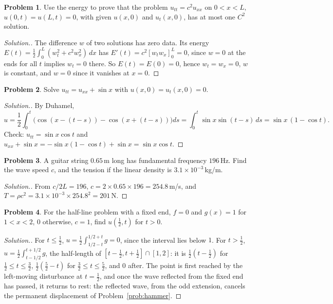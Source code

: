 \documentclass[11pt,a4paper]{article}
\numberwithin{equation}{section}
\theoremstyle{definition}
\newtheorem{problemx}{Problem}[subsection]
\newenvironment{problem}{\begin{problemx}}{\end{problemx}}
\newenvironment{solution}
  {\renewcommand{\qedsymbol}{}\begin{proof}[\textit{Solution}.]}
  {\end{proof}}
\begin{document}
\begin{problem}
Use the energy to prove that the problem $u_{tt} = c^2u_{xx}$ on $0 < x < L$, $u(0, t) = u(L, t) = 0$, with given $u(x, 0)$ and $u_t(x, 0)$, has at most one $C^2$ solution.
\end{problem}

\begin{solution}
The difference $w$ of two solutions has zero data. Its energy $E(t) = \frac12\int_0^L(w_t^2 + c^2w_x^2)\,dx$ has $E'(t) = c^2[w_tw_x]_0^L = 0$, since $w = 0$ at the ends for all $t$ implies $w_t = 0$ there. So $E(t) = E(0) = 0$, hence $w_t = w_x = 0$, $w$ is constant, and $w = 0$ since it vanishes at $x = 0$.
\end{solution}

\begin{problem}
Solve $u_{tt} = u_{xx} + \sin x$ with $u(x, 0) = u_t(x, 0) = 0$.
\end{problem}

\begin{solution}
By Duhamel,
\[
u = \frac12\int_0^t\bigl(\cos(x - (t - s)) - \cos(x + (t - s))\bigr)ds = \int_0^t\sin x\sin(t - s)\,ds = \sin x\,(1 - \cos t) .
\]
Check: $u_{tt} = \sin x\cos t$ and $u_{xx} + \sin x = -\sin x(1 - \cos t) + \sin x = \sin x\cos t$.
\end{solution}

\begin{problem}
A guitar string $0.65$\,m long has fundamental frequency $196$\,Hz. Find the wave speed $c$, and the tension if the linear density is $3.1 \times 10^{-3}$\,kg/m.
\end{problem}

\begin{solution}
From $c/2L = 196$, $c = 2 \times 0.65 \times 196 = 254.8$\,m/s, and $T = \rho c^2 = 3.1 \times 10^{-3} \times 254.8^2 = 201$\,N.
\end{solution}

\begin{problem}
For the half-line problem with a fixed end, $f = 0$ and $g(x) = 1$ for $1 < x < 2$, $0$ otherwise, $c = 1$, find $u(\frac12, t)$ for $t > 0$.
\end{problem}

\begin{solution}
For $t \leq \frac12$, $u = \frac12\int_{1/2 - t}^{1/2 + t}g = 0$, since the interval lies below $1$. For $t > \frac12$, $u = \frac12\int_{t - 1/2}^{t + 1/2}g$, the half-length of $[t - \frac12, t + \frac12] \cap [1, 2]$: it is $\frac12(t - \frac12)$ for $\frac12 \leq t \leq \frac32$, $\frac12(\frac52 - t)$ for $\frac32 \leq t \leq \frac52$, and $0$ after. The point is
first reached by the left-moving disturbance at $t = \frac12$, and once the wave reflected from the fixed end has passed, it returns to rest: the reflected wave, from the odd extension, cancels the permanent displacement of Problem~\ref{prob:hammer}.
\end{solution}
\end{document}

